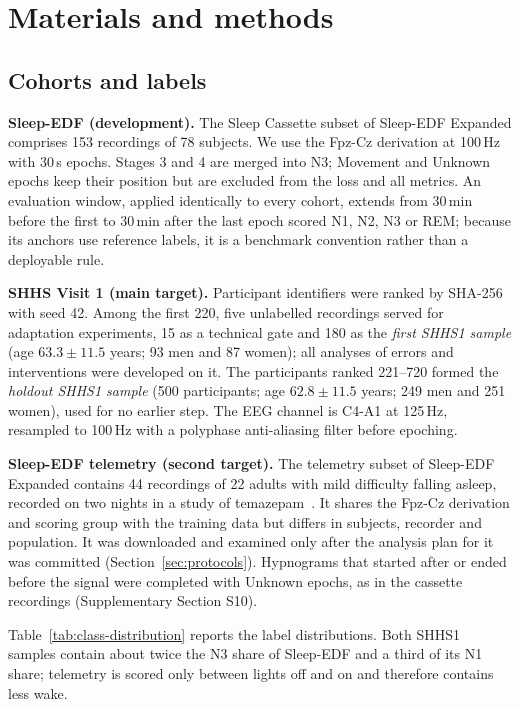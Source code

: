 \documentclass[11pt,a4paper]{article}
\begin{document}
\section{Materials and methods}

\subsection{Cohorts and labels}

\textbf{Sleep-EDF (development).} The Sleep Cassette subset of Sleep-EDF Expanded comprises 153
recordings of 78 subjects. We use the Fpz-Cz derivation at 100\,Hz with 30\,s epochs. Stages 3 and 4
are merged into N3; Movement and Unknown epochs keep their position but are excluded from the loss
and all metrics. An evaluation window, applied identically to every cohort, extends from 30\,min
before the first to 30\,min after the last epoch scored N1, N2, N3 or REM; because its anchors use
reference labels, it is a benchmark convention rather than a deployable rule.

\textbf{SHHS Visit 1 (main target).} Participant identifiers were ranked by SHA-256 with seed 42.
Among the first 220, five unlabelled recordings served for adaptation experiments, 15 as a technical
gate and 180 as the \emph{first SHHS1 sample} (age $63.3\pm11.5$ years; 93 men and 87 women); all
analyses of errors and interventions were developed on it. The participants ranked 221--720 formed
the \emph{holdout SHHS1 sample} (500 participants; age $62.8\pm11.5$ years; 249 men and 251 women),
used for no earlier step. The EEG channel is C4-A1 at 125\,Hz, resampled to 100\,Hz with a polyphase
anti-aliasing filter before epoching.

\textbf{Sleep-EDF telemetry (second target).} The telemetry subset of Sleep-EDF Expanded contains 44
recordings of 22 adults with mild difficulty falling asleep, recorded on two nights in a study of
temazepam~\cite{kemp2000sleepEDF}. It shares the Fpz-Cz derivation and scoring group with the
training data but differs in subjects, recorder and population. It was downloaded and examined only
after the analysis plan for it was committed (Section~\ref{sec:protocols}). Hypnograms that started
after or ended before the signal were completed with Unknown epochs, as in the cassette recordings
(Supplementary Section S10).

Table~\ref{tab:class-distribution} reports the label distributions. Both SHHS1 samples contain about
twice the N3 share of Sleep-EDF and a third of its N1 share; telemetry is scored only between lights
off and on and therefore contains less wake.
\end{document}
